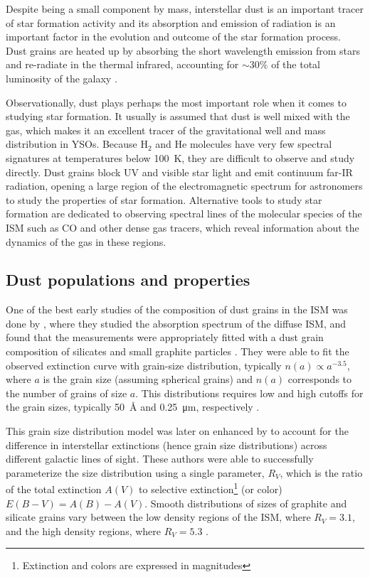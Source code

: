 Despite being a small component by mass, interstellar dust is an important tracer of star formation activity and its absorption and emission of radiation is an important factor in the evolution and outcome of the star formation process. Dust grains are heated up by absorbing the short wavelength emission from stars and re-radiate in the thermal infrared, accounting for $\sim 30\%$ of the total luminosity of the galaxy \citep{Mathis:1990jk}. 

Observationally, dust plays perhaps the most important role when it comes to studying star formation. It usually is assumed that dust is well mixed with the gas, which makes it an excellent tracer of the gravitational well and mass distribution in YSOs. Because H$_2$ and He molecules have very few spectral signatures at temperatures below \SI{100}{\kelvin}, they are difficult to observe and study directly. Dust grains block UV and visible star light and emit continuum far-IR radiation, opening a large region of the electromagnetic spectrum for astronomers to study the properties of star formation. Alternative tools to study star formation are dedicated to observing spectral lines of the molecular species of the ISM such as CO and other dense gas tracers, which reveal information about the dynamics of the gas in these regions.%


\subsection{Dust populations and properties}


One of the best early studies of the composition of dust grains in the ISM was done by \citet{Mathis:1977hp}, where they studied the absorption spectrum of the diffuse ISM, and found that the measurements were appropriately fitted with a dust grain composition of silicates and small graphite particles \citep{Stecher:1965eq}. They were able to fit the observed extinction curve with grain-size distribution, typically $n(a) \propto a^{-3.5}$, where $a$ is the grain size (assuming spherical grains) and $n(a)$ corresponds to the number of grains of size $a$. This distributions requires low and high cutoffs for the grain sizes, typically \SI{50}{\angstrom} and \SI{0.25}{\micro\meter}, respectively \citep{Weingartner:2001du}.

This grain size distribution model was later on enhanced by \citet{Cardelli:1989dp} to account for the difference in interstellar extinctions (hence grain size distributions) across different galactic lines of sight. These authors were able to successfully parameterize the size distribution using a single parameter, $R_V$, which is the ratio of the total extinction $A(V)$ to selective extinction\footnote{Extinction and colors are expressed in magnitudes} (or color) $E(B-V) = A(B) - A(V)$. Smooth distributions of sizes of graphite and silicate grains vary between the low density regions of the ISM, where $R_V = 3.1$, and the high density regions, where $R_V = 5.3$ \citep{Kim:1994iu}. 

